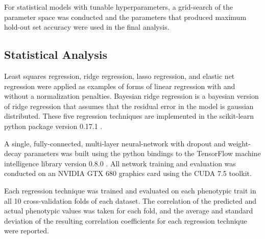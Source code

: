 \documentclass[9pt,twocolumn,twoside]{g3_article/gsag3jnl}
\begin{document}
For statistical models with tunable hyperparameters, a grid-search of the parameter 
space was conducted and the parameters that produced maximum hold-out set accuracy 
were used in the final analysis. 


\subsection*{Statistical Analysis} 

Least squares regression, ridge regression, lasso regression, and elastic net regression were applied as examples of
forms of linear regression with and without a normalization penalties. Bayesian ridge regression is a bayesian
version of ridge regression that assumes that the residual error in the model is gaussian distributed. These
five regression techniques are implemented in the scikit-learn python package version 0.17.1 \citep{scikit-learn}.

A single, fully-connected, multi-layer neural-network with dropout and weight-decay parameters was built using 
the python bindings to the TensorFlow machine intelligence library version 0.8.0 \citep{tensorflow2015}. All network training
and evaluation was conducted on an NVIDIA GTX 680 graphics card using the CUDA 7.5 toolkit. 

Each regression technique was trained and evaluated on each phenotypic trait in all 10 cross-validation folds of each dataset.
The correlation of the predicted and actual phenotypic values was taken for each fold, and the average and 
standard deviation of the resulting correlation coefficients for each regression technique were reported.
 
\end{document}
